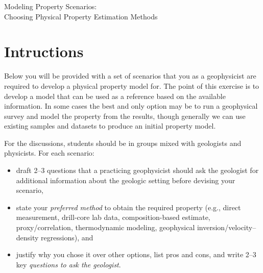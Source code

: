 
\begin{activity}{Modeling Property Scenarios:\\Choosing Physical Property Estimation Methods}

\newcommand{\yourplan}{
    \textbf{Your plan}

    \textbf{2--3 Questions for the Geologist}
    \answerbox[6cm]

    \vspace{0.4em}
    \textbf{Preferred method and why}
    \answerbox[4cm]

    \vspace{0.4em}
    \begin{multicols}{2}
    \noindent\textbf{Pros}
    \begin{itemize}
        \setlength{\itemsep}{0.8em}
        \item \rule{0.88\linewidth}{0.4pt}
        \item \rule{0.88\linewidth}{0.4pt}
    \end{itemize}

    \columnbreak

    \noindent\textbf{Cons}
    \begin{itemize}
        \setlength{\itemsep}{0.8em}
        \item \rule{0.88\linewidth}{0.4pt}
        \item \rule{0.88\linewidth}{0.4pt}
    \end{itemize}
    \end{multicols}
}

\section*{Intructions}
 Below you will be provided with a set of scenarios that you as a geophysicist are required to develop a physical property model for.  The point of this exercise is to develop a model that can be used as a reference based on the available information.  In some cases the best and only option may be to run a geophysical survey and model the property from the results, though generally we can use existing samples and datasets to produce an initial property model.

For the discussions, students should be in groups mixed with geologists and physicists.   
 For each scenario:
 \begin{itemize}
    \item draft 2--3 questions that a practicing geophysicist should ask the geologist for additional information about the geologic setting before devising your scenario,
    \item state your \emph{preferred method} to obtain the required property (e.g., direct measurement, drill-core lab data, composition-based estimate, proxy/correlation, thermodynamic modeling, geophysical inversion/velocity--density regressions), and
    \item justify why you chose it over other options, list pros and cons, and write 2--3 key \emph{questions to ask the geologist}. 
 \end{itemize}
 

\end{activity}
